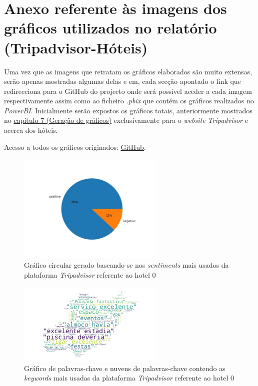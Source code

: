 \chapter{Anexo referente às imagens dos gráficos utilizados no relatório (Tripadvisor-Hóteis)}

Uma vez que as imagens que retratam os gráficos elaborados são muito extensas, serão apenas mostradas algumas delas e em, cada secção apontado o link que redirecciona para o GitHub do projecto onde será possível aceder a cada imagem respectivamente assim como ao ficheiro \textit{.pbix} que contém os gráficos realizados no \textit{PowerBI}.
Inicialmente serão expostos os gráficos totais, anteriormente mostrados no \hyperref[cap7]{ capítulo 7 (Geração de gráficos)} exclusivamente para o \textit{website Tripadvisor} e acerca dos hóteis.

Acesso a todos os gráficos originados: \href{https://github.com/CatKinKitKat/pi2021/tree/master/projecto/datascience/graphs/tripadvisor/hotels}{GitHub}.

\label{an1}
\begin{figure}[!htb]
\centering
\includegraphics[width=7cm]{figuras/TripAdvisor/Hotels/hotel0_sentiments.jpeg}
\caption{Gráfico circular gerado baseando-se nos \textit{sentiments} mais usados da plataforma \textit{Tripadvisor} referente ao hotel 0}
\label{fig:exemplofig}
\end{figure}

\begin{figure}[!htb]
\centering
\includegraphics[width=7cm]{figuras/TripAdvisor/Hotels/hotel0_keywordcloud.jpeg}
\caption{Gráfico de palavras-chave e nuvens de palavras-chave contendo as \textit{keywords} mais usadas da plataforma \textit{Tripadvisor} referente ao hotel 0}
\label{fig:exemplofig}
\end{figure}

